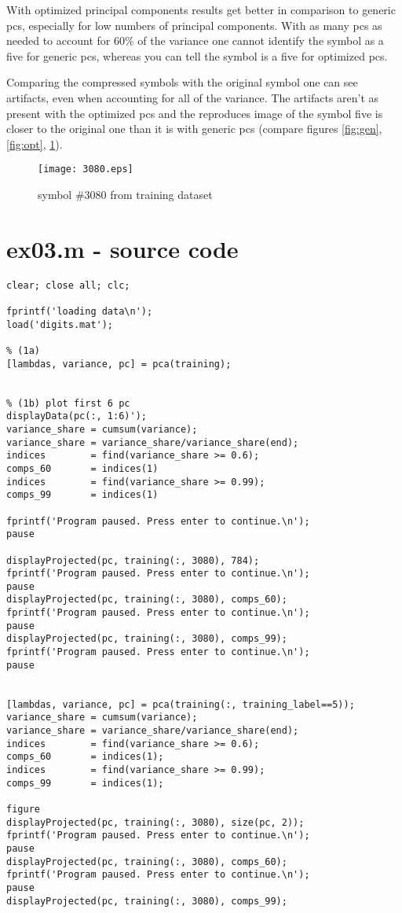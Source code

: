 \documentclass[a4paper,11pt]{article}
\theoremstyle{definition}
\theoremstyle{plain}
\theoremstyle{remark}
\begin{document}
With optimized principal components results get better in comparison to generic pcs, especially for low numbers of principal components. With as many pcs as needed to account for 60\% of the variance one cannot identify the symbol as a five for generic pcs, whereas you can tell the symbol is a five for optimized pcs.

Comparing the compressed symbols with the original symbol one can see artifacts, even when accounting for all of the variance. The artifacts aren't as present with the optimized pcs and the reproduces image of the symbol five is closer to the original one than it is with generic pcs (compare figures \ref{fig:gen}, \ref{fig:opt}, \ref{fig:3080}).

\clearpage
\begin{figure}
\centering
\texttt{[image: 3080.eps]}
\caption{symbol \#3080 from training dataset}
\label{fig:3080}
\end{figure}

\clearpage
\section*{ex03.m - source code}


\begin{lstlisting}
clear; close all; clc;

fprintf('loading data\n');
load('digits.mat');

% (1a)
[lambdas, variance, pc] = pca(training);


% (1b) plot first 6 pc
displayData(pc(:, 1:6)');
variance_share = cumsum(variance);
variance_share = variance_share/variance_share(end);
indices        = find(variance_share >= 0.6);
comps_60       = indices(1)
indices        = find(variance_share >= 0.99);
comps_99       = indices(1)

fprintf('Program paused. Press enter to continue.\n');
pause

displayProjected(pc, training(:, 3080), 784);
fprintf('Program paused. Press enter to continue.\n');
pause
displayProjected(pc, training(:, 3080), comps_60);
fprintf('Program paused. Press enter to continue.\n');
pause
displayProjected(pc, training(:, 3080), comps_99);
fprintf('Program paused. Press enter to continue.\n');
pause


[lambdas, variance, pc] = pca(training(:, training_label==5));
variance_share = cumsum(variance);
variance_share = variance_share/variance_share(end);
indices        = find(variance_share >= 0.6);
comps_60       = indices(1);
indices        = find(variance_share >= 0.99);
comps_99       = indices(1);

figure
displayProjected(pc, training(:, 3080), size(pc, 2));
fprintf('Program paused. Press enter to continue.\n');
pause
displayProjected(pc, training(:, 3080), comps_60);
fprintf('Program paused. Press enter to continue.\n');
pause
displayProjected(pc, training(:, 3080), comps_99);
\end{lstlisting}
\end{document}

